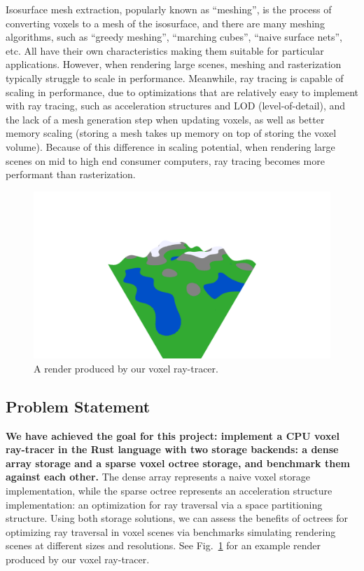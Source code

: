 \documentclass[conference]{IEEEtran}
\begin{document}
Isosurface mesh extraction, popularly known as “meshing”, is the process of converting voxels to a mesh of the isosurface, and there are many meshing algorithms, such as “greedy meshing”, “marching cubes”, “naive surface nets”, etc.
All have their own characteristics making them suitable for particular applications.
However, when rendering large scenes, meshing and rasterization typically struggle to scale in performance.
Meanwhile, ray tracing is capable of scaling in performance, due to optimizations that are relatively easy to implement with ray tracing, such as acceleration structures and LOD (level-of-detail), and the lack of a mesh generation step when updating voxels, as well as better memory scaling (storing a mesh takes up memory on top of storing the voxel volume).
Because of this difference in scaling potential, when rendering large scenes on mid to high end consumer computers, ray tracing becomes more performant than rasterization.

\begin{figure}[htbp]
\centerline{\includegraphics[width=\linewidth]{render}}
\caption{A render produced by our voxel ray-tracer.}
\label{render}
\end{figure}

\subsection{Problem Statement}

\textbf{We have achieved the goal for this project: implement a CPU voxel ray-tracer in the Rust language with two storage backends: a dense array storage and a sparse voxel octree storage, and benchmark them against each other.}
The dense array represents a naive voxel storage implementation, while the sparse octree represents an acceleration structure implementation: an optimization for ray traversal via a space partitioning structure.
Using both storage solutions, we can assess the benefits of octrees for optimizing ray traversal in voxel scenes via benchmarks simulating rendering scenes at different sizes and resolutions.
See Fig.~\ref{render} for an example render produced by our voxel ray-tracer.
\end{document}
